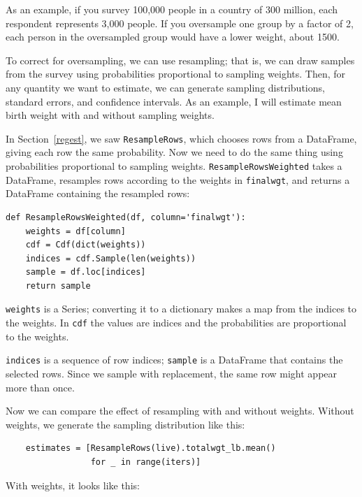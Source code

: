 \documentclass[12pt]{book}
\begin{document}
As an example, if you survey 100,000 people in a country of 300
million, each respondent represents 3,000 people.  If you oversample
one group by a factor of 2, each person in the oversampled
group would have a lower weight, about 1500.

To correct for oversampling, we can use resampling; that is, we
can draw samples from the survey using probabilities proportional
to sampling weights.  Then, for any quantity we want to estimate, we can
generate sampling distributions, standard errors, and confidence
intervals.  As an example, I will estimate mean birth weight with
and without sampling weights.

In Section~\ref{regest}, we saw {\tt ResampleRows}, which chooses
rows from a DataFrame, giving each row the same probability.
Now we need to do the same thing using probabilities
proportional to sampling weights.
{\tt ResampleRowsWeighted} takes a DataFrame, resamples rows according
to the weights in {\tt finalwgt}, and returns a DataFrame containing
the resampled rows:

\begin{verbatim}
def ResampleRowsWeighted(df, column='finalwgt'):
    weights = df[column]
    cdf = Cdf(dict(weights))
    indices = cdf.Sample(len(weights))
    sample = df.loc[indices]
    return sample
\end{verbatim}

{\tt weights} is a Series; converting it to a dictionary makes
a map from the indices to the weights.  In {\tt cdf} the values
are indices and the probabilities are proportional to the
weights.

{\tt indices} is a sequence of row indices; {\tt sample} is a
DataFrame that contains the selected rows.  Since we sample with
replacement, the same row might appear more than once.  

Now we can compare the effect of resampling with and without
weights.  Without weights, we generate the sampling distribution
like this:

\begin{verbatim}
    estimates = [ResampleRows(live).totalwgt_lb.mean()
                 for _ in range(iters)]
\end{verbatim}

With weights, it looks like this:
\end{document}
